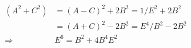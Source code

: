 \begin{equation}
  \begin{split}
(A^2 + C^2)  &= (A-C)^2 +2B^2 =1/E^2 + 2B^2 \\
       &= (A+C)^2 -2B^2 = E^4/B^2 - 2B^2 \\
\Rightarrow & E^6 =B^2 + 4 B^4 E^2
  \end{split}
\end{equation}


